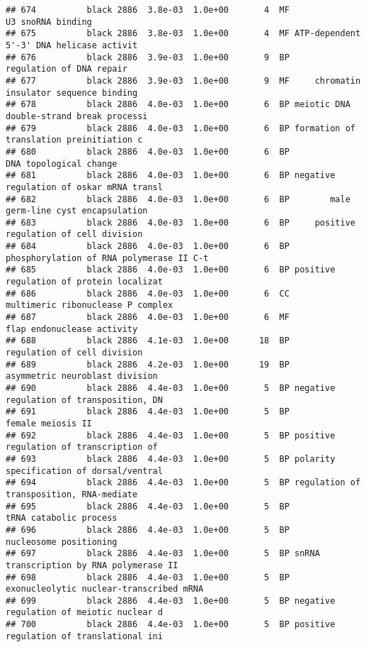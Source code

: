 \documentclass[]{article}
\begin{document}
\begin{verbatim}
## 674          black 2886  3.8e-03  1.0e+00       4  MF                        U3 snoRNA binding
## 675          black 2886  3.8e-03  1.0e+00       4  MF ATP-dependent 5'-3' DNA helicase activit
## 676          black 2886  3.9e-03  1.0e+00       9  BP                 regulation of DNA repair
## 677          black 2886  3.9e-03  1.0e+00       9  MF     chromatin insulator sequence binding
## 678          black 2886  4.0e-03  1.0e+00       6  BP meiotic DNA double-strand break processi
## 679          black 2886  4.0e-03  1.0e+00       6  BP formation of translation preinitiation c
## 680          black 2886  4.0e-03  1.0e+00       6  BP                   DNA topological change
## 681          black 2886  4.0e-03  1.0e+00       6  BP negative regulation of oskar mRNA transl
## 682          black 2886  4.0e-03  1.0e+00       6  BP        male germ-line cyst encapsulation
## 683          black 2886  4.0e-03  1.0e+00       6  BP     positive regulation of cell division
## 684          black 2886  4.0e-03  1.0e+00       6  BP phosphorylation of RNA polymerase II C-t
## 685          black 2886  4.0e-03  1.0e+00       6  BP positive regulation of protein localizat
## 686          black 2886  4.0e-03  1.0e+00       6  CC        multimeric ribonuclease P complex
## 687          black 2886  4.0e-03  1.0e+00       6  MF               flap endonuclease activity
## 688          black 2886  4.1e-03  1.0e+00      18  BP              regulation of cell division
## 689          black 2886  4.2e-03  1.0e+00      19  BP           asymmetric neuroblast division
## 690          black 2886  4.4e-03  1.0e+00       5  BP negative regulation of transposition, DN
## 691          black 2886  4.4e-03  1.0e+00       5  BP                        female meiosis II
## 692          black 2886  4.4e-03  1.0e+00       5  BP positive regulation of transcription of 
## 693          black 2886  4.4e-03  1.0e+00       5  BP polarity specification of dorsal/ventral
## 694          black 2886  4.4e-03  1.0e+00       5  BP regulation of transposition, RNA-mediate
## 695          black 2886  4.4e-03  1.0e+00       5  BP                   tRNA catabolic process
## 696          black 2886  4.4e-03  1.0e+00       5  BP                   nucleosome positioning
## 697          black 2886  4.4e-03  1.0e+00       5  BP snRNA transcription by RNA polymerase II
## 698          black 2886  4.4e-03  1.0e+00       5  BP exonucleolytic nuclear-transcribed mRNA 
## 699          black 2886  4.4e-03  1.0e+00       5  BP negative regulation of meiotic nuclear d
## 700          black 2886  4.4e-03  1.0e+00       5  BP positive regulation of translational ini

\end{verbatim}
\end{document}
